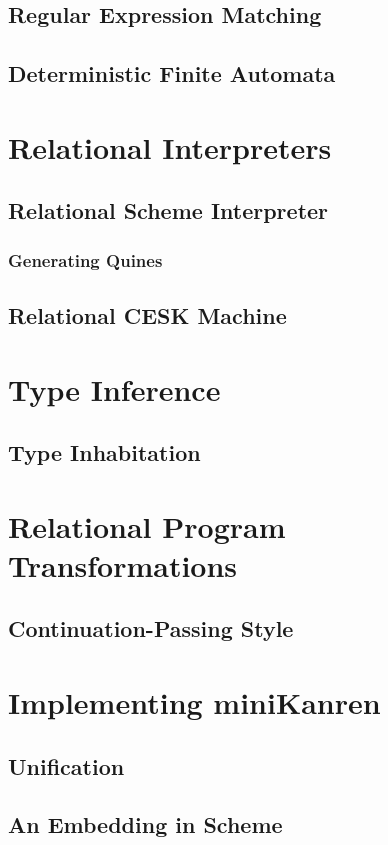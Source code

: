 \documentclass[11pt]{book}
\begin{document}
\begin{schemeregion}
\section{Regular Expression Matching}
\section{Deterministic Finite Automata}

\chapter{Relational Interpreters}
\section{Relational Scheme Interpreter}
\subsection{Generating Quines}
\section{Relational CESK Machine}

\chapter{Type Inference}
\section{Type Inhabitation}

\chapter{Relational Program Transformations}
\section{Continuation-Passing Style}

\chapter{Implementing miniKanren}
\section{Unification}
\section{An Embedding in Scheme}

\end{schemeregion}
\end{document}
